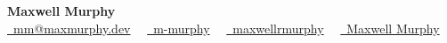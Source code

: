 \centering
    {\Large \textbf{Maxwell Murphy}} \\
    {
        \href{mailto:mm@maxmurphy.dev}{\faEnvelope \, mm@maxmurphy.dev} \, \textbullet \,
        \href{https://www.github.com/m-murphy}{\faGithub \, m-murphy} \, \textbullet \,
        \href{https://www.linkedin.com/in/maxwellrmurphy/}{\faLinkedin \, maxwellrmurphy} \, \textbullet \,
        \href{https://scholar.google.com/citations?user=Y1cHI8IAAAAJ}{\aiGoogleScholar \, Maxwell Murphy}
    }

\justifying
